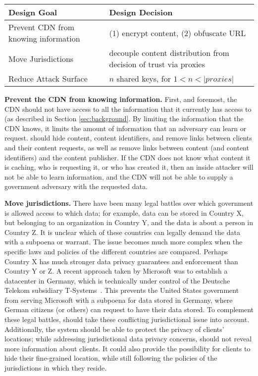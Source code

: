 \begin{table*}[h]
\centering
\begin{tabular}{| l | l |} 
 \hline
 {\bf Design Goal} & {\bf Design Decision} \\ 
 \hline\hline
 Prevent CDN from knowing information & (1) encrypt content, (2) obfuscate URL  \\ \hline
 Move Jurisdictions & decouple content distribution from decision of trust via proxies  \\ \hline
 Reduce Attack Surface & $n$ shared keys, for $1 < n < |proxies|$ \\ 
 \hline
\end{tabular}
\caption{Design goals and the corresponding design choices made in \system{}.}
\label{tab:design_goals}
\end{table*}

{\bf Prevent the CDN from knowing information.} First, and foremost, the CDN 
should not have access to all the information that it currently has access to (as described 
in Section \ref{sec:background}.  By limiting the information that the CDN knows, it limits 
the amount of information that an adversary can learn or request.  \system{} should hide 
content, content identifiers, and remove links between clients and their content requests, as well 
as remove links between content (and content identifiers) and the content publisher.  If the CDN 
does not know what content it is caching, who is requesting it, or who has created it, then an 
inside attacker will not be able to learn information, and the CDN will not be able to supply 
a government adversary with the requested data.

{\bf Move jurisdictions.} There have been many legal battles over which government is allowed access 
to which data; for example, data can be stored in Country X, but belonging to an organization in Country Y, and 
the data is about a person in Country Z.  It is unclear which of these countries can legally demand 
the data with a subpoena or warrant.  The issue becomes much more complex when the specific laws 
and policies of the different countries are compared.  Perhaps Country X has much stronger data privacy 
guarantees and enforcement than Country Y or Z.  A recent approach taken by Microsoft was to establish 
a datacenter in Germany, which is technically under control of the Deutsche Telekom subsidiary 
T-Systems~\cite{microsoft_germany}.  This prevents the United States government from serving Microsoft with a subpoena 
for data stored in Germany, where German citizens (or others) can request to have their data stored.
  To complement these legal battles, \system{} should take 
these conflicting jurisdictional issue into account.  Additionally, the system should be able to protect 
the privacy of clients' locations; while addressing jurisdictional data privacy concerns, \system{} 
should not reveal more information about clients.  It could also provide the possibility for clients 
to hide their fine-grained location, while still following the policies of the jurisdictions in which 
they reside.

